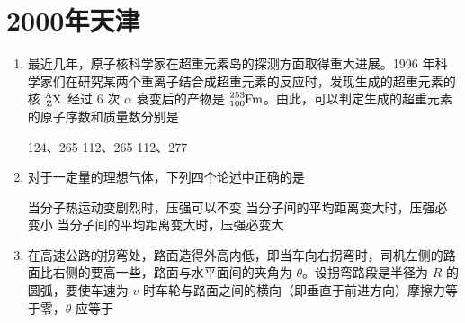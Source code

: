 \documentclass[\gkver]{gaokaozhenti}
\begin{document}
\chapter{2000年天津}

\begin{enumerate}
\item
最近几年，原子核科学家在超重元素岛的探测方面取得重大进展。1996 年科学家们在研究某两个重离子结合成超重元素的反应时，发现生成的超重元素的核 $\ce{^{A}_{Z}X}$ 经过 6 次 $\alpha$ 衰变后的产物是 $\ce{^{253}_{100}Fm}$。由此，可以判定生成的超重元素的原子序数和质量数分别是 

{124、265}
{112、265}
{112、277}


\item
对于一定量的理想气体，下列四个论述中正确的是 

{当分子热运动变剧烈时，压强可以不变}
{当分子间的平均距离变大时，压强必变小}
{当分子间的平均距离变大时，压强必变大}


\item
在高速公路的拐弯处，路面造得外高内低，即当车向右拐弯时，司机左侧的路面比右侧的要高一些，路面与水平面间的夹角为 $\theta$。设拐弯路段是半径为 $R$ 的圆弧，要使车速为 $v$ 时车轮与路面之间的横向（即垂直于前进方向）摩擦力等于零，$\theta$ 应等于 


\end{enumerate}
\end{document}
